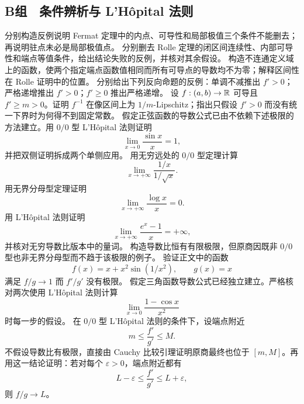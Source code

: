 \subsection*{B组　条件辨析与 L'Hôpital 法则}
\begin{enumerate}[label=\textbf{\thechapter.\arabic*.},ref=\thechapter.\arabic*,leftmargin=3.4em,labelsep=0.7em,itemsep=0.85em,topsep=0.8em,resume]
  分别构造反例说明 Fermat 定理中的内点、可导性和局部极值三个条件不能删去；再说明驻点未必是局部极值点。
  分别删去 Rolle 定理的闭区间连续性、内部可导性和端点等值条件，给出结论失败的反例，并核对其余假设。
  构造不连通定义域上的函数，使两个指定端点函数值相同而所有可导点的导数均不为零；解释区间性在 Rolle 证明中的位置。
  分别给出下列反向命题的反例：单调不减推出 \(f'>0\)；严格递增推出 \(f'>0\)；\(f'\ge0\) 推出严格递增。
  设 \(f:(a,b)\to\mathbb{R}\) 可导且 \(f'\ge m>0\)。证明 \(f^{-1}\) 在像区间上为 \(1/m\)-Lipschitz；指出只假设 \(f'>0\) 而没有统一下界时为何得不到固定常数。
  假定正弦函数的导数公式已由不依赖下述极限的方法建立。用 \(0/0\) 型 L'Hôpital 法则证明
 \[
  \lim_{x\to0}\frac{\sin x}{x}=1,
 \]
 并把双侧证明拆成两个单侧应用。
  用无穷远处的 \(0/0\) 型定理计算
 \[
  \lim_{x\to+\infty}\frac{1/x}{1/\sqrt{x}}.
 \]
  用无界分母型定理证明
 \[
  \lim_{x\to+\infty}\frac{\log x}{x}=0.
 \]
  用 L'Hôpital 法则证明
 \[
  \lim_{x\to+\infty}\frac{e^x-1}{x}=+\infty,
 \]
 并核对无穷导数比版本中的量词。
  构造导数比恒有有限极限，但原商因既非 \(0/0\) 型也非无界分母型而不趋于该极限的例子。
  验证正文中的函数
 \[
  f(x)=x+x^2\sin(1/x^2),\qquad g(x)=x
 \]
 满足 \(f/g\to1\) 而 \(f'/g'\) 没有极限。
  假定三角函数导数公式已经独立建立。严格核对两次使用 L'Hôpital 法则计算
 \[
  \lim_{x\to0}\frac{1-\cos x}{x^2}
 \]
 时每一步的假设。
  在 \(0/0\) 型 L'Hôpital 法则的条件下，设端点附近
 \[
  m\le\frac{f'}{g'}\le M.
 \]
 不假设导数比有极限，直接由 Cauchy 比较引理证明原商最终也位于 \([m,M]\)。再用这一结论证明：若对每个 \(\varepsilon>0\)，端点附近都有
 \[
  L-\varepsilon\le\frac{f'}{g'}\le L+\varepsilon,
 \]
 则 \(f/g\to L\)。
\end{enumerate}

